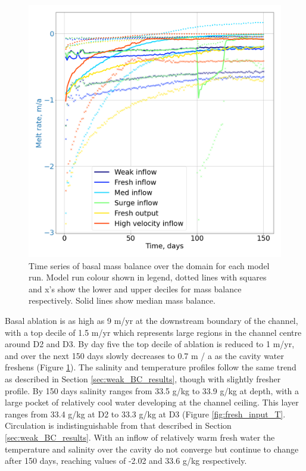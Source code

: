 \begin{figure}[!ht]
\centering
\includegraphics[width=1\textwidth]{chapters/4/compare_melt_sum.png}
\caption[]{Time series of basal mass balance over the domain for each model run. Model run colour shown in legend, dotted lines with squares and x's show the lower and upper deciles for mass balance respectively. Solid lines show median mass balance.}
\label{fig:compare_melt_sum}
\end{figure}


Basal ablation is as high as 9 m/yr at the downstream boundary of the channel, with a top decile of 1.5 m/yr which represents large regions in the channel centre around D2 and D3. By day five the top decile of ablation is reduced to 1 m/yr, and over the next 150 days  slowly decreases to 0.7 m / a as the cavity water freshens (Figure \ref{fig:compare_melt_sum}).
The salinity and temperature profiles follow the same trend as described in Section \ref{sec:weak_BC_results}, though with slightly fresher profile. By 150 days salinity ranges from 33.5 g/kg to 33.9 g/kg at depth, with a large pocket of relatively cool water developing at the channel ceiling. This layer ranges from 33.4 g/kg at D2  to 33.3 g/kg at D3 (Figure \ref{fig:fresh_input_T}. 
Circulation is indistinguishable from that described in Section \ref{sec:weak_BC_results}. 
With an inflow of relatively warm fresh  water the temperature and salinity over the cavity do not converge but continue to change after 150 days, reaching values of -2.02 \textdegree and 33.6 g/kg respectively.

